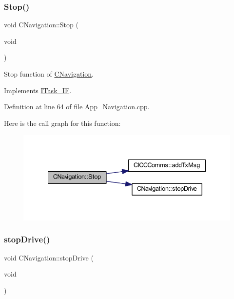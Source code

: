 \subsubsection{\texorpdfstring{Stop()}{Stop()}}
{\footnotesize\ttfamily void C\+Navigation\+::\+Stop (\begin{DoxyParamCaption}\item[{void}]{ }\end{DoxyParamCaption})\hspace{0.3cm}{\ttfamily [virtual]}}



Stop function of \mbox{\hyperlink{class_c_navigation}{C\+Navigation}}. 



Implements \mbox{\hyperlink{class_i_task___i_f_af5f8fba86704c7e36d0e4681d58300c6}{I\+Task\+\_\+\+IF}}.



Definition at line 64 of file App\+\_\+\+Navigation.\+cpp.

Here is the call graph for this function\+:
\nopagebreak
\begin{figure}[H]
\begin{center}
\leavevmode
\includegraphics[width=334pt]{class_c_navigation_a3cc8f7fdd003d6b2c5056b87ff93edd9_cgraph}
\end{center}
\end{figure}
\mbox{\label{class_c_navigation_a06ce71124d487f1f9febf36a0e4b2a5d}} 
\subsubsection{\texorpdfstring{stopDrive()}{stopDrive()}}
{\footnotesize\ttfamily void C\+Navigation\+::stop\+Drive (\begin{DoxyParamCaption}\item[{void}]{ }\end{DoxyParamCaption})\hspace{0.3cm}{\ttfamily [virtual]}}



